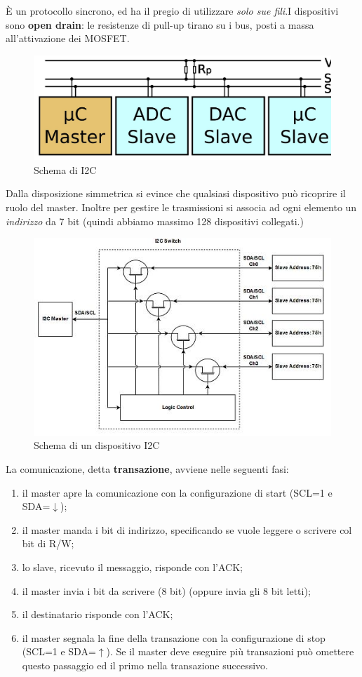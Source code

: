 \documentclass[
]{book}
\providecommand{\tightlist}{%
  \setlength{\itemsep}{0pt}\setlength{\parskip}{0pt}}
\begin{document}
È un protocollo sincrono, ed ha il pregio di utilizzare \emph{solo sue
fili}.\newline I dispositivi sono \textbf{open drain}: le resistenze di
pull-up tirano su i bus, posti a massa all'attivazione dei MOSFET.

\begin{figure}
\centering
\includegraphics[width=0.5\linewidth,height=\textheight,keepaspectratio]{assets/imgs/I2C.jpg}
\caption{Schema di I2C}
\end{figure}

Dalla disposizione simmetrica si evince che qualsiasi dispositivo può
ricoprire il ruolo del master. Inoltre per gestire le trasmissioni si
associa ad ogni elemento un \emph{indirizzo} da 7 bit (quindi abbiamo
massimo 128 dispositivi collegati.)

\begin{figure}
\centering
\includegraphics[width=0.5\linewidth,height=\textheight,keepaspectratio]{assets/imgs/i2c_device.jpg}
\caption{Schema di un dispositivo I2C}
\end{figure}

La comunicazione, detta \textbf{transazione}, avviene nelle seguenti
fasi:

\begin{enumerate}
\def\labelenumi{\arabic{enumi})}
\tightlist
\item
  il master apre la comunicazione con la configurazione di start (SCL=1
  e SDA=\(\downarrow\));
\item
  il master manda i bit di indirizzo, specificando se vuole leggere o
  scrivere col bit di R/W;
\item
  lo slave, ricevuto il messaggio, risponde con l'ACK;
\item
  il master invia i bit da scrivere (8 bit) (oppure invia gli 8 bit
  letti);
\item
  il destinatario risponde con l'ACK;
\item
  il master segnala la fine della transazione con la configurazione di
  stop (SCL=1 e SDA=\(\uparrow\)). Se il master deve eseguire più
  transazioni può omettere questo passaggio ed il primo nella
  transazione successivo.
\end{enumerate}
\end{document}
